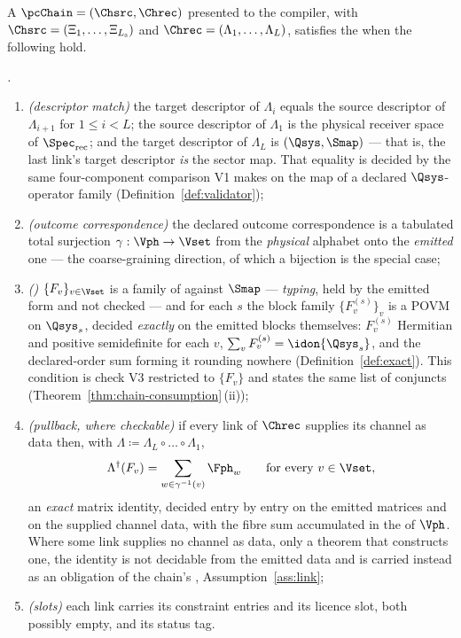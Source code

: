 \begin{definition}\label{def:chaincond}
A  $\pcChain=(\Chsrc,\Chrec)$ presented to the compiler, with
$\Chsrc=(\Xi_1,\dots,\Xi_{L_{\mathrm s}})$ and
$\Chrec=(\Lambda_1,\dots,\Lambda_L)$, satisfies the
when the following hold.

\emph{.}
\begin{enumerate}[label=(C\arabic*),leftmargin=3.0em]
\item \emph{(descriptor match)} the target descriptor of $\Lambda_i$ equals the
source descriptor of $\Lambda_{i+1}$ for $1\le i<L$; the source descriptor of
$\Lambda_1$ is the physical receiver space of $\Spec_{\mathrm{rec}}$; and the
target descriptor of $\Lambda_L$ is $(\Qsys,\Smap)$ --- that is, the last
link's target descriptor \emph{is} the sector map. That equality is
decided by the same four-component comparison V1 makes on the map of a
declared $\Qsys$-operator family (Definition~\ref{def:validator});
\item \emph{(outcome correspondence)} the declared outcome correspondence is a
tabulated total surjection $\gamma:\Vph\to\Vset$ from the \emph{physical}
alphabet onto the \emph{emitted} one --- the coarse-graining direction, of
which a bijection is the special case;
\item \emph{()} $\{F_v\}_{v\in\Vset}$ is a family of
 against $\Smap$ --- \emph{typing}, held by the
emitted form and not checked --- and for each $s$ the block family
$\{F_v^{(s)}\}_v$ is a POVM on $\Qsys_s$, decided \emph{exactly} on the
emitted blocks themselves: $F_v^{(s)}$ Hermitian and positive semidefinite
for each $v$, $\sum_vF_v^{(s)}=\idon{\Qsys_s}$, and the declared-order sum
forming it rounding nowhere (Definition~\ref{def:exact}). This condition is
check V3 restricted to $\{F_v\}$ and states the same list of conjuncts
(Theorem~\ref{thm:chain-consumption}\,(ii));
\item \emph{(pullback, where checkable)} if every link of $\Chrec$ supplies its
channel as data then, with
$\Lambda\coloneqq\Lambda_L\circ\dots\circ\Lambda_1$,
\begin{equation}\label{eq:pullback}
  \Lambda^{\dagger}(F_v)=\sum_{w\in\gamma^{-1}(v)}\Fph_w
  \qquad\text{for every }v\in\Vset ,
\end{equation}
an \emph{exact} matrix identity, decided entry by entry on the emitted matrices
and on the supplied channel data, with the fibre sum accumulated in the
 of $\Vph$. Where some link supplies no channel as data,
only a theorem that constructs one, the identity is not decidable from the
emitted data and is carried instead as an obligation of the chain's
, Assumption~\ref{ass:link};
\item \emph{(slots)} each link carries its constraint entries and its licence
slot, both possibly empty, and its status tag.
\end{enumerate}


\end{definition}
